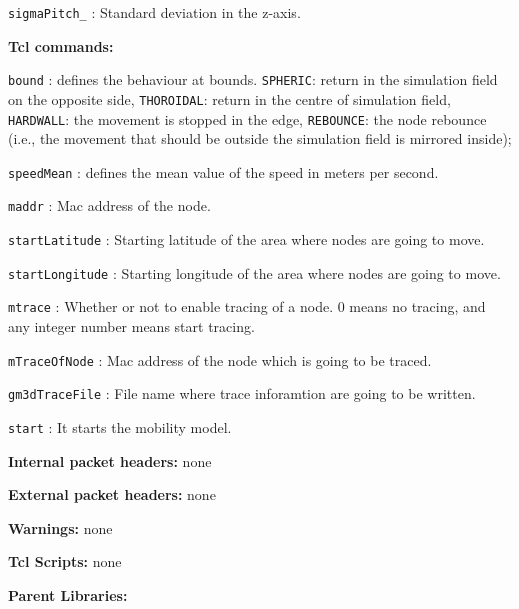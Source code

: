 \begin{description}
\begin{description}
      \item {\tt sigmaPitch\_} : Standard deviation in the z-axis.
    \end{description}
   \item {\bf Tcl commands:}
    \begin{description}
      \item {\tt bound} : defines the behaviour at bounds. {\tt SPHERIC}: return in the simulation field on the opposite side, {\tt THOROIDAL}: return in the centre of simulation field, {\tt HARDWALL}: the movement is stopped in the edge, {\tt REBOUNCE}: the node rebounce (i.e., the movement that should be outside the simulation field is mirrored inside);
      \item {\tt speedMean} : defines the mean value of the speed in meters per second.
      \item {\tt maddr} : Mac address of the node. 
      \item {\tt startLatitude} : Starting latitude of the area where nodes are going to move. 
      \item {\tt startLongitude} : Starting longitude of the area where nodes are going to move. 
      \item {\tt mtrace} : Whether or not to enable tracing of a node. $0$ means no tracing, and any integer number means start tracing.
      \item {\tt mTraceOfNode} : Mac address of the node which is going to be traced.
      \item {\tt gm3dTraceFile} : File name where trace inforamtion are going to be written.
      \item {\tt start} : It starts the mobility model.
    \end{description}
   \item {\bf Internal packet headers:} none
   \item {\bf External packet headers:} none
   \item {\bf Warnings:} none
   \item {\bf Tcl Scripts:} none
   \item {\bf Parent Libraries:}
\end{description}

\vspace{1 cm}


